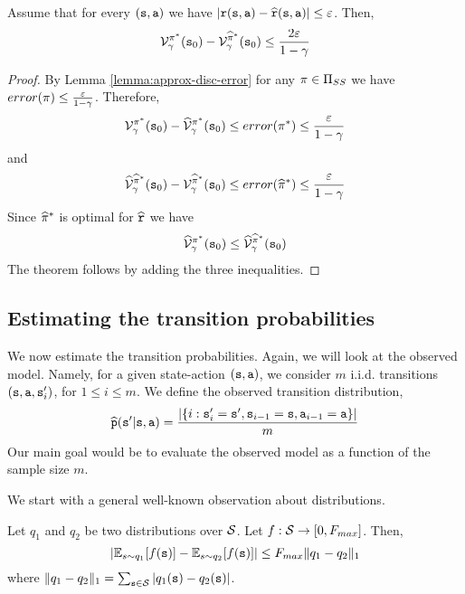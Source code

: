 \begin{theorem}
\label{thm:approx-model-disc}
%
Assume that for every $({\tt s},{\tt a})$ we have
$|{\tt r}({\tt s},{\tt a})-\widehat{{\tt r}}({\tt s},{\tt a})|\leq
\varepsilon$. Then,
\[
\mathcal{V}^{\pi^*}_\gamma({\tt s}_0) -
\mathcal{V}^{\widehat{\pi}^*}_\gamma({\tt s}_0) \leq
\frac{2\varepsilon}{1-\gamma}
\]
\end{theorem}

\begin{proof}
By Lemma \ref{lemma:approx-disc-error} for any $\pi\in {\Pi
_{SS}}$ we have $error(\pi)\leq
\frac{\varepsilon}{1-\gamma}$. Therefore,
\[
\mathcal{V}^{\pi^*}_\gamma({\tt s}_0)-
\widehat{\mathcal{V}}^{\pi^*}_\gamma({\tt s}_0)\leq
error(\pi^*)\leq \frac{\varepsilon}{1-\gamma}
\]
and
\[
\widehat{\mathcal{V}}^{\widehat{\pi}^*}_\gamma({\tt s}_0)-
\mathcal{V}^{\widehat{\pi}^*}_\gamma({\tt s}_0)\leq
error(\widehat{\pi}^*)\leq \frac{\varepsilon}{1-\gamma}
\]
Since $\widehat{\pi}^*$ is optimal for $\widehat{{\tt r}}$ we
have
\[
\widehat{\mathcal{V}}^{\pi^*}_\gamma({\tt s}_0)\leq
\widehat{\mathcal{V}}^{\widehat{\pi}^*}_\gamma({\tt s}_0)
\]
The theorem follows by adding the three inequalities.
\end{proof}

\subsection{Estimating the transition probabilities}

We now estimate the transition probabilities. Again, we will look at
the observed model. Namely, for a given state-action
$({\tt s},{\tt a})$, we consider $m$ i.i.d.
 transitions
$({\tt s},{\tt a},{\tt s}'_i)$, for $1\leq i\leq m$. We define the
observed transition distribution,
\[
\widehat{{\tt p}}({\tt s}'|{\tt s},{\tt a})=\frac{|\{i:{\tt s}'_i={\tt s}',{\tt s}_{i-1}={\tt s},{\tt a}_{i-1}={\tt a}\}|}{m}
\]
Our main goal would be to evaluate the observed model as a function
of the sample size $m$.


We start with a general well-known observation about distributions.

\begin{theorem}
\label{thm:dist-l1} Let $q_1$ and $q_2$ be two distributions over
$\mathcal{S}$. Let $f:\mathcal{S} \rightarrow [0,F_{max}]$. Then,
\[
|\mathbb{E}_{s\sim q_1}[f({\tt s})]- \mathbb{E}_{s\sim q_2}[f({\tt s})]|\leq F_{max}
\|q_1-q_2\|_1
\]
where $\|q_1-q_2\|_1=\sum_{{\tt s} \in \mathcal{S}}
|q_1({\tt s})-q_2({\tt s})|$.
\end{theorem}

